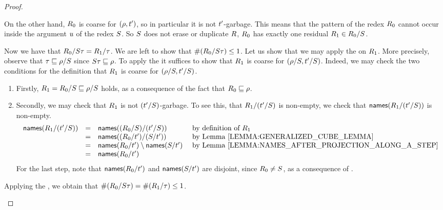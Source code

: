 \begin{proof}
\begin{enumerate}
\begin{enumerate}
    On the other hand, $R_0$ is coarse for $(\rho,t')$, so in particular
    it is not $t'$-garbage.
    This means that the pattern of the redex $R_0$ cannot occur inside the argument $u$
    of the redex $S$.
    So $S$ does not erase or duplicate $R$,
    \ie $R_0$ has exactly one residual $R_1 \in R_0/S$.
  \end{enumerate}
  Now we have that $R_0/S\tau = R_1/\tau$.
  We are left to show that $\#(R_0/S\tau) \leq 1$.
  Let us show that we may apply the \ih on $R_1$.
  More precisely, observe that $\tau \sqsubseteq \rho/S$ since $S\tau \sqsubseteq \rho$.
  To apply the \ih it suffices to show that $R_1$ is coarse for $(\rho/S,t'/S)$.
  Indeed, we may check the two conditions
  for the definition that $R_1$ is coarse for $(\rho/S,t'/S)$.
  \begin{enumerate}
  \item Firstly, $R_1 = R_0/S \sqsubseteq \rho/S$ holds, as a consequence of the fact that $R_0 \sqsubseteq \rho$.
  \item Secondly, we may check that $R_1$ is not $(t'/S)$-garbage.
        To see this, \ie that $R_1/(t'/S)$ is non-empty,
        we check that $\mathsf{names}(R_1/(t'/S))$ is non-empty.
        \[
          \begin{array}{rcll}
          \names(\redex_1/(\tm'/\redextwo))
          & = & \names((\redex_0/\redextwo)/(\tm'/\redextwo)) & \text{ by definition of $\redex_1$} \\
          & = & \names((\redex_0/\tm')/(\redextwo/\tm')) & \text{ by \rlem{generalized_cube_lemma}} \\
          & = & \names(\redex_0/\tm') \setminus \names(\redextwo/\tm') & \text{ by \rlem{names_after_projection_along_a_step}} \\
          & = & \names(\redex_0/\tm')
          \end{array}
        \]
        For the last step, note that $\mathsf{names}(R_0/t')$ and $\mathsf{names}(S/t')$ are disjoint,
        since $R_0 \neq S$, as a consequence of .
  \end{enumerate}
  Applying the \ih, we obtain that $\#(R_0/S\tau) = \#(R_1/\tau) \leq 1$.  
\end{enumerate}
\end{proof}

